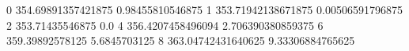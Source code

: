 0 354.69891357421875 0.98455810546875
1 353.71942138671875 0.00506591796875
2 353.71435546875 0.0
4 356.4207458496094 2.706390380859375
6 359.39892578125 5.6845703125
8 363.04742431640625 9.33306884765625
